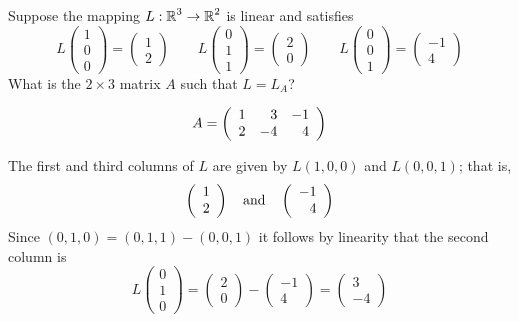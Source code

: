 \documentclass{ximera}
\author{Matthew Carr}
\begin{document}

\begin{exercise}\label{mc.exercise7}

Suppose the mapping $L:\mbox{$\mathbb{R}$}^3\to\mbox{$\mathbb{R}$}^2$ is linear and satisfies
\[
L \left(\begin{array}{c} 1 \\ 0 \\0 \end{array}\right) = \left(\begin{array}{c} 1 \\ 2  \end{array}\right) \qquad
L \left(\begin{array}{c} 0 \\ 1\\ 1 \end{array}\right) = \left(\begin{array}{c} 2 \\ 0 \end{array}\right) \qquad
L\left(\begin{array}{c} 0 \\ 0 \\ 1 \end{array}\right) = \left(\begin{array}{r} -1 \\ 4 \end{array}\right)
\]
What is the  $2\times 3$ matrix $A$ such that $L = L_A$?

  
\begin{solution}

\ans \[
A = \left(\begin{array}{rrrrrrrrrrrrrrrrrr} 1 & 3 & -1\\ 2 & -4 & 4 \end{array}\right)
\]

\soln 
The first and third columns of $L$ are given by $L(1,0,0)$ and $L(0,0,1)$; that is,
\[
\left(\begin{array}{c} 1 \\ 2  \end{array}\right) \quad\mbox{and}\quad \left(\begin{array}{r} -1 \\ 4 \end{array}\right)
\]
Since $(0,1,0) = (0,1,1) - (0,0,1)$ it follows by linearity that the second column is 
\[
L \left(\begin{array}{c} 0 \\ 1\\ 0 \end{array}\right) = \left(\begin{array}{c} 2 \\ 0  \end{array}\right) - \left(\begin{array}{r} -1 \\ 4 \end{array}\right) = \left(\begin{array}{r} 3 \\ -4 \end{array}\right)
\]
\end{solution}
\end{exercise}
\end{document}
